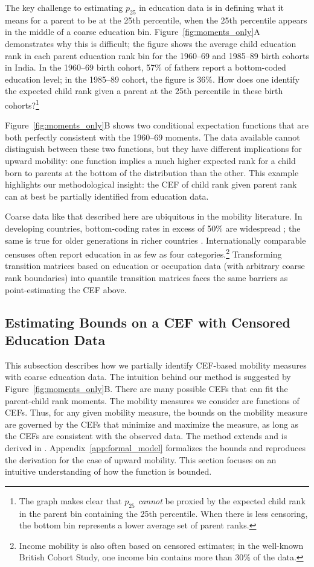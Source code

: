 \documentclass[12pt,letterpaper]{article}
\numberwithin{equation}{section}
\begin{document}
The key challenge to estimating $p_{25}$ in education data is in defining what it means for a parent to be at the 25th percentile, when the 25th percentile appears in the middle of a coarse education bin. Figure~\ref{fig:moments_only}A demonstrates why this is difficult; the figure shows the average child education rank in each parent education rank bin for the 1960--69 and 1985--89 birth cohorts in India. In the 1960--69 birth cohort, 57\% of fathers report a bottom-coded education level; in the 1985--89 cohort, the figure is 36\%. How does one identify the expected child rank given a parent at the 25th percentile in these birth cohorts?\footnote{The graph makes clear that $p_{25}$ \textit{cannot} be proxied by the expected child rank in the parent bin containing the 25th percentile. When there is less censoring, the bottom bin represents a lower average set of parent ranks.}

Figure~\ref{fig:moments_only}B shows two conditional expectation functions that are both perfectly consistent with the 1960--69 moments. The data available cannot distinguish between these two functions, but they have different implications for upward mobility: one function implies a much higher expected rank for a child born to parents at the bottom of the distribution than the other. This example highlights our methodological insight: the CEF of child rank given parent rank can at best be partially identified from education data.

Coarse data like that described here are ubiquitous in the mobility literature. In developing countries, bottom-coding rates in excess of 50\% are widespread \cite{narayan2018}; the same is true for older generations in richer countries \cite{long2013}. Internationally comparable censuses often report education in as few as four categories.\footnote{Income mobility is also often based on censored estimates; in the well-known British Cohort Study, one income bin contains more than 30\% of the data.} Transforming transition matrices based on education or occupation data (with arbitrary coarse rank boundaries) into quantile transition matrices faces the same barriers as point-estimating the CEF above.

\subsection{Estimating Bounds on a CEF with Censored Education Data}
\label{ssec:math}

This subsection describes how we partially identify CEF-based mobility measures with coarse education data. The intuition behind our method is suggested by Figure~\ref{fig:moments_only}B. There are many possible CEFs that can fit the parent-child rank moments. The mobility measures we consider are functions of CEFs. Thus, for any given mobility measure, the bounds on the mobility measure are governed by the CEFs that minimize and maximize the measure, as long as the CEFs are consistent with the observed data. The method extends  and is derived in . Appendix~\ref{app:formal_model} formalizes the bounds and reproduces the derivation for the case of upward mobility. This section focuses on an intuitive understanding of how the function is bounded.
\end{document}
